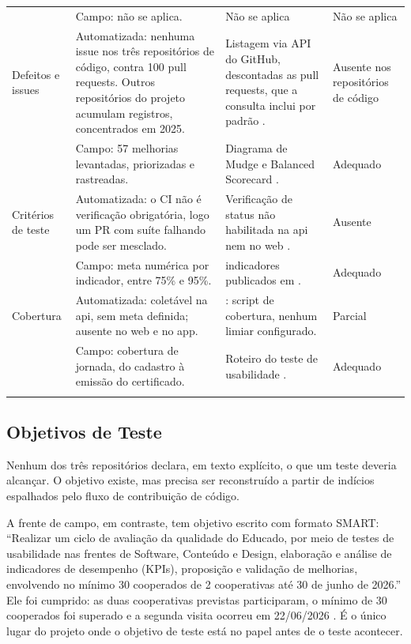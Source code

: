 {\begin{longtable}{>{\raggedright\arraybackslash}p{2.1cm} >{\raggedright\arraybackslash}p{4.3cm} >{\raggedright\arraybackslash}p{4.4cm} >{\raggedright\arraybackslash}p{1.6cm}}
& Campo: não se aplica.
& Não se aplica
& Não se aplica
\\
\addlinespace
Defeitos e issues
& Automatizada: nenhuma issue nos três repositórios de código, contra 100 pull requests. Outros repositórios do projeto acumulam registros, concentrados em 2025.
& Listagem via API do GitHub, descontadas as pull requests, que a consulta inclui por padrão \cite{educado-repos}.
& Ausente nos repositórios de código
\\[0.1cm]

& Campo: 57 melhorias levantadas, priorizadas e rastreadas.
& Diagrama de Mudge \cite[p.~28]{psp5} e Balanced Scorecard \cite[p.~71]{psp5}.
& Adequado
\\
\addlinespace
Critérios de teste
& Automatizada: o CI não é verificação obrigatória, logo um PR com suíte falhando pode ser mesclado.
& Verificação de status não habilitada na api nem no web \cite{educado-repos}.
& Ausente
\\[0.1cm]

& Campo: meta numérica por indicador, entre 75\% e 95\%.
& 15 indicadores publicados em \cite{dashboard}.
& Adequado
\\
\addlinespace
Cobertura
& Automatizada: coletável na api, sem meta definida; ausente no web e no app.
& \cite{educado-repos}: script de cobertura, nenhum limiar configurado.
& Parcial
\\[0.1cm]

& Campo: cobertura de jornada, do cadastro à emissão do certificado.
& Roteiro do teste de usabilidade \cite[p.~17]{psp5}.
& Adequado
\\
\addlinespace
\bottomrule
\end{longtable}
}



\subsection{Objetivos de Teste}

Nenhum dos três repositórios declara, em texto explícito, o que um teste deveria
alcançar. O objetivo existe, mas precisa ser reconstruído a partir de indícios
espalhados pelo fluxo de contribuição de código.

A frente de campo, em contraste, tem objetivo escrito com formato SMART:
``Realizar um ciclo de avaliação da qualidade do Educado, por meio de testes de
usabilidade nas frentes de Software, Conteúdo e Design, elaboração e análise de
indicadores de desempenho (KPIs), proposição e validação de melhorias,
envolvendo no mínimo 30 cooperados de 2 cooperativas até 30 de junho de 2026.''
Ele foi cumprido: as duas cooperativas previstas participaram, o mínimo de 30
cooperados foi superado e a segunda visita ocorreu em 22/06/2026 \cite[p.~10]{psp5}. É
o único lugar do projeto onde o objetivo de teste está no papel antes de o teste
acontecer.

